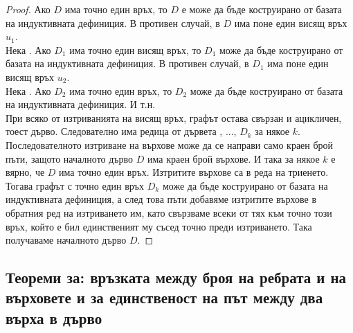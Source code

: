 \begin{proof}
    Ако \(D\) има точно един връх, то \(D\) е може да бъде коструирано от базата на индуктивната дефиниция. В 
    противен случай, в \(D\) има поне един висящ връх \(u_1\). \\
    Нека . Ако \(D_1\) има точно един висящ връх, то \(D_1\) може да бъде коструирано 
    от базата на индуктивната дефиниция. В противен случай, в \(D_1\) има поне един висящ връх \(u_2\). \\
    Нека . Ако \(D_2\) има точно един връх, то \(D_2\) може да бъде коструирано от
    базата на индуктивната дефиниция. И т.н. \\
    При всяко от изтриванията на висящ връх, графът остава свързан и ацикличен, тоест дърво. Следователно 
    има редица от дървета , ..., \(D_k\) за някое \(k\). Последователното изтриване на 
    върхове може да се направи само краен брой пъти, защото началното дърво \(D\) има краен брой върхове. 
    И така за някое \(k\) е вярно, че \(D\) има точно един връх. Изтритите върхове са  в 
    реда на триенето. Тогава графът с точно един връх \(D_k\) може да бъде коструирано от базата на 
    индуктивната дефиниция, а след това  пъти добавяме изтритите върхове в обратния ред 
    на изтриването им, като свързваме всеки от тях към точно този връх, който е бил единственият му съсед 
    точно преди изтриването. Така получаваме началното дърво \(D\). 
\end{proof}

\subsection*{Теореми за: връзката между броя на ребрата и на върховете и за единственост на път между два върха в дърво}

